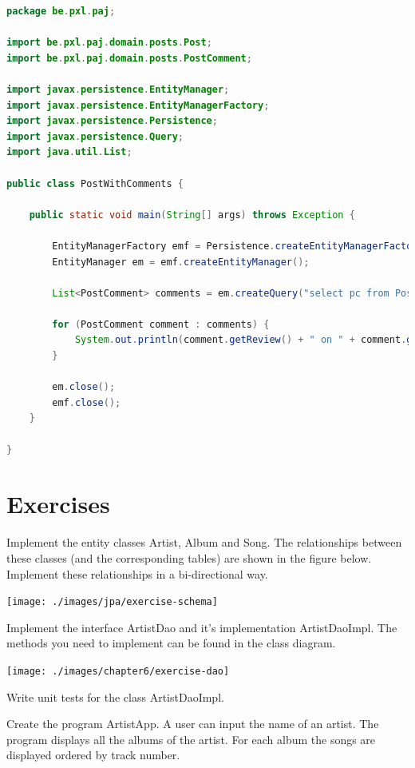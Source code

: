 \begin{lstlisting}[frame=single,  language=java]
package be.pxl.paj;

import be.pxl.paj.domain.posts.Post;
import be.pxl.paj.domain.posts.PostComment;

import javax.persistence.EntityManager;
import javax.persistence.EntityManagerFactory;
import javax.persistence.Persistence;
import javax.persistence.Query;
import java.util.List;

public class PostWithComments {

	public static void main(String[] args) throws Exception {

		EntityManagerFactory emf = Persistence.createEntityManagerFactory("musicdb_pu");
		EntityManager em = emf.createEntityManager();

		List<PostComment> comments = em.createQuery("select pc from PostComment pc join fetch pc.post p", PostComment.class).getResultList();
		
		for (PostComment comment : comments) {
			System.out.println(comment.getReview() + " on " + comment.getPost().getTitle());
		}

		em.close();
		emf.close();
	}

}
\end{lstlisting}


\section{Exercises}

\begin{oefening}
Implement the entity classes Artist, Album and Song. The relationships between these classes (and the corresponding tables) are shown in the figure below.  Implement these relationships in a bi-directional way.

\texttt{[image: ./images/jpa/exercise-schema]}

Implement the interface ArtistDao and it's implementation ArtistDaoImpl. The methods you need to implement can be found in the class diagram.

\texttt{[image: ./images/chapter6/exercise-dao]}

Write unit tests for the class ArtistDaoImpl.

Create the program ArtistApp. A user can input the name of an artist. The program displays all the albums of the artist. For each album the songs are displayed ordered by track number.
\end{oefening}


